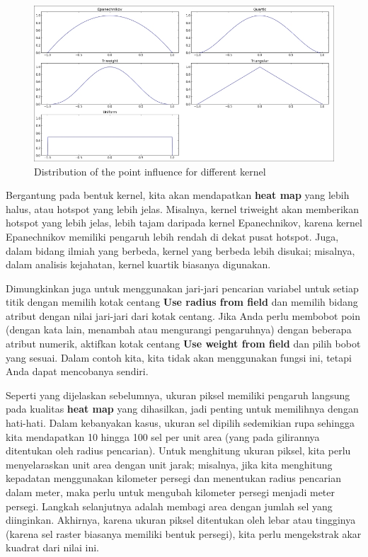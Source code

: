\documentclass[]{book}
\begin{document}
\begin{figure}

{\centering \includegraphics[width=0.8\linewidth]{images/04/fig8} 

}

\caption{Distribution of the point influence for different kernel}\label{fig:fig1410}
\end{figure}

Bergantung pada bentuk kernel, kita akan mendapatkan \textbf{heat map} yang lebih halus, atau hotspot yang lebih jelas. Misalnya, kernel triweight akan memberikan hotspot yang lebih jelas, lebih tajam daripada kernel Epanechnikov, karena kernel Epanechnikov memiliki pengaruh lebih rendah di dekat pusat hotspot. Juga, dalam bidang ilmiah yang berbeda, kernel yang berbeda lebih disukai; misalnya, dalam analisis kejahatan, kernel kuartik biasanya digunakan.

Dimungkinkan juga untuk menggunakan jari-jari pencarian variabel untuk setiap titik dengan memilih kotak centang \textbf{Use radius from field} dan memilih bidang atribut dengan nilai jari-jari dari kotak centang. Jika Anda perlu membobot poin (dengan kata lain, menambah atau mengurangi pengaruhnya) dengan beberapa atribut numerik, aktifkan kotak centang \textbf{Use weight from field} dan pilih bobot yang sesuai. Dalam contoh kita, kita tidak akan menggunakan fungsi ini, tetapi Anda dapat mencobanya sendiri.

Seperti yang dijelaskan sebelumnya, ukuran piksel memiliki pengaruh langsung pada kualitas \textbf{heat map} yang dihasilkan, jadi penting untuk memilihnya dengan hati-hati. Dalam kebanyakan kasus, ukuran sel dipilih sedemikian rupa sehingga kita mendapatkan 10 hingga 100 sel per unit area (yang pada gilirannya ditentukan oleh radius pencarian). Untuk menghitung ukuran piksel, kita perlu menyelaraskan unit area dengan unit jarak; misalnya, jika kita menghitung kepadatan menggunakan kilometer persegi dan menentukan radius pencarian dalam meter, maka perlu untuk mengubah kilometer persegi menjadi meter persegi. Langkah selanjutnya adalah membagi area dengan jumlah sel yang diinginkan. Akhirnya, karena ukuran piksel ditentukan oleh lebar atau tingginya (karena sel raster biasanya memiliki bentuk persegi), kita perlu mengekstrak akar kuadrat dari nilai ini.
\end{document}
